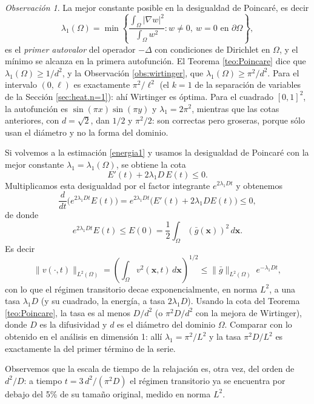 \documentclass[12pt, a4paper]{amsbook}
\newcommand{\xx}{{\mathbf x}}
\theoremstyle{remark}
\newtheorem{obs}[teo]{Observación}
\theoremstyle{definition}
\numberwithin{section}{chapter}
\numberwithin{subsection}{section}
\numberwithin{equation}{section}
\numberwithin{figure}{chapter}
\begin{document}
\begin{obs}\label{obs:poincare-optima}
La mejor constante posible en la desigualdad de Poincaré, es decir
$$
\lambda_1(\Omega) = \min\left\{\frac{\int_\Omega|\nabla w|^2}{\int_\Omega w^2}\colon w\neq 0,\ w=0 \text{ en }\partial\Omega\right\},
$$
es el \emph{primer autovalor} del operador $-\Delta$ con condiciones de Dirichlet en $\Omega$, y el mínimo se alcanza en la primera autofunción. El Teorema \ref{teo:Poincare} dice que $\lambda_1(\Omega)\ge 1/d^2$, y la Observación \ref{obs:wirtinger}, que $\lambda_1(\Omega)\ge \pi^2/d^2$. Para el intervalo $(0,\ell)$ es exactamente $\pi^2/\ell^2$ (el $k=1$ de la separación de variables de la Sección \ref{sec:heat.n=1}): ahí Wirtinger es óptima. Para el cuadrado $[0,1]^2$, la autofunción es $\sin(\pi x)\sin(\pi y)$ y $\lambda_1 = 2\pi^2$, mientras que las cotas anteriores, con $d=\sqrt2$, dan $1/2$ y $\pi^2/2$: son correctas pero groseras, porque sólo usan el diámetro y no la forma del dominio.
\end{obs}

Si volvemos a la estimación \eqref{energia1} y usamos la desigualdad de Poincaré con la mejor constante $\lambda_1 = \lambda_1(\Omega)$, se obtiene la cota
\begin{equation}\label{energia2}
E'(t) + 2\lambda_1 D\, E(t)\le 0 .
\end{equation}
Multiplicamos esta desigualdad por el factor integrante $e^{2\lambda_1 D t}$ y obtenemos
$$
\frac{d}{dt}\bigl(e^{2\lambda_1 Dt} E(t)\bigr) = e^{2\lambda_1 Dt}\bigl(E'(t) + 2\lambda_1 D E(t)\bigr)\le 0,
$$
de donde
$$
e^{2\lambda_1 D t} E(t)\le E(0) = \frac12\int_\Omega (\bar g(\xx))^2\, d\xx.
$$
Es decir
\begin{equation}\label{eq:decaimiento-L2}
\|v(\cdot,t)\|_{L^2(\Omega)} = \left(\int_\Omega v^2(\xx,t)\, d\xx\right)^{1/2}\le \|\bar g\|_{L^2(\Omega)}\; e^{-\lambda_1 D t},
\end{equation}
con lo que el régimen transitorio decae exponencialmente, en norma $L^2$, a una tasa $\lambda_1 D$ (y su cuadrado, la energía, a tasa $2\lambda_1 D$). Usando la cota del Teorema \ref{teo:Poincare}, la tasa es al menos $D/d^2$ (o $\pi^2D/d^2$ con la mejora de Wirtinger), donde $D$ es la difusividad y $d$ es el diámetro del dominio $\Omega$. Comparar con lo obtenido en el análisis en dimensión 1: allí $\lambda_1 = \pi^2/L^2$ y la tasa $\pi^2D/L^2$ es exactamente la del primer término de la serie.

Observemos que la escala de tiempo de la relajación es, otra vez, del orden de $d^2/D$: a tiempo $t=3\,d^2/(\pi^2 D)$ el régimen transitorio ya se encuentra por debajo del 5\% de su tamaño original, medido en norma $L^2$.
\end{document}
